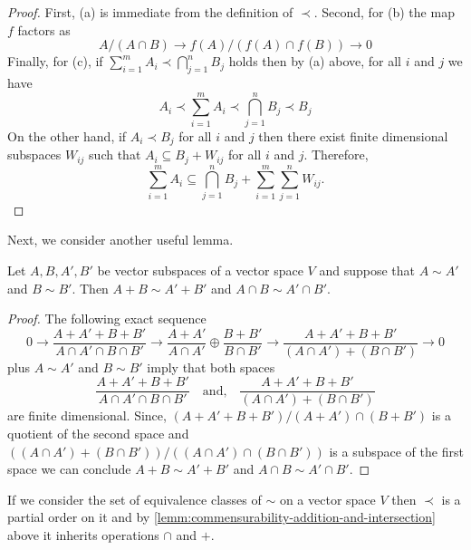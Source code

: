 \begin{proof}
	First, (a) is immediate from the definition of $\prec$. Second, for (b) the map $f$ factors as
	\[
		A/(A\cap B) \to f(A)/(f(A)\cap f(B)) \to 0
	\]
	Finally, for (c), if $\sum_{i=1}^{m} A_{i} \prec \bigcap_{j=1}^{n} B_{j}$ holds then by (a) above, for all $i$ and $j$ we have
	\[
		A_{i} \prec \sum_{i=1}^{m} A_{i} \prec \bigcap_{j=1}^{n} B_{j} \prec B_{j}
	\]
	On the other hand, if $A_{i} \prec B_{j}$ for all $i$ and $j$ then there exist finite dimensional subspaces $W_{ij}$ such that $A_{i} \subseteq B_{j} + W_{ij}$ for all $i$ and $j$. Therefore,
	\[
		\sum_{i=1}^{m} A_{i} \subseteq \bigcap_{j=1}^{n} B_{j} + \sum_{i=1}^{m} \sum_{j=1}^{n} W_{ij}.
	\]

\end{proof}
Next, we consider another useful lemma.
\begin{lemma}\label{lemm:commensurability-addition-and-intersection}
	Let $A,B,A',B'$ be vector subspaces of a vector space $V$ and suppose that $A \sim A'$ and $B \sim B'$. Then $A + B \sim A' + B'$ and $A \cap B \sim A' \cap B'$.
\end{lemma}
\begin{proof}
	The following exact sequence 
	\small
	\[
		0 \to \frac{A + A' + B + B'}{A\cap A'\cap B\cap B'} \to \frac{A + A'}{A \cap A'} \oplus \frac{B + B'}{B \cap B'} \to \frac{A + A' + B + B'}{(A\cap A') + (B\cap B')} \to 0
	\]
	\normalsize
	plus $A \sim A'$ and $B \sim B'$ imply that both spaces
	\[
		\frac{A + A' + B + B'}{A\cap A'\cap B\cap B'} \quad\text{and,}\quad
		 \frac{A + A' + B + B'}{(A\cap A') + (B\cap B')}
	\]	
	are finite dimensional. Since, $(A + A' + B + B')/(A+A')\cap(B+B')$ is a quotient of the second space and $((A \cap A') + (B \cap B'))/((A\cap A')\cap(B\cap B'))$ is a subspace of the first space we can conclude $A + B \sim A' + B'$ and $A \cap B \sim A' \cap B'$.
\end{proof}
If we consider the set of equivalence classes of $\sim$ on a vector space $V$ then $\prec$ is a partial order on it and by \cref{lemm:commensurability-addition-and-intersection} above it inherits operations $\cap$ and $+$.
